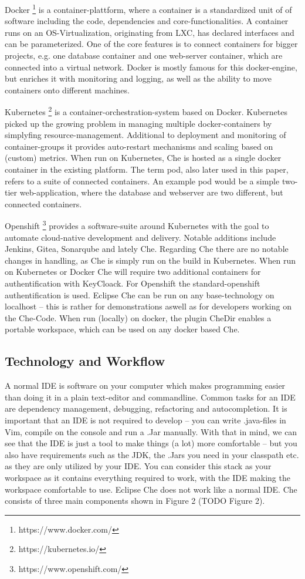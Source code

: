 \documentclass[utf8,biblatex]{lni}
\begin{document}
Docker \footnote{https://www.docker.com/} is a container-plattform, where a container is a standardized unit of of software including the code, dependencies and core-functionalities. 
A container runs on an OS-Virtualization, originating from LXC, has declared interfaces and can be parameterized. 
One of the core features is to connect containers for bigger projects, e.g. one 
database container and one web-server container, which are connected into a virtual network. 
Docker is mostly famous for this docker-engine, but enriches it with monitoring and logging, as well as the ability to move containers onto different machines.   

Kubernetes \footnote{https://kubernetes.io/} is a container-orchestration-system based on Docker. 
Kubernetes picked up the growing problem in managing multiple docker-containers by  simplyfing  resource-management. 
Additional to deployment and monitoring of container-groups it provides auto-restart mechanisms and scaling based on (custom) metrics. 
When run on Kubernetes, Che is hosted as a single docker container in the existing platform.
The term pod, also later used in this paper, refers to a suite of connected containers. 
An example pod would be a simple two-tier web-application, where the database and webserver are two different, but connected containers.

Openshift \footnote{https://www.openshift.com/} provides a software-suite around Kubernetes with the goal to automate cloud-native development and delivery.
Notable  additions  include  Jenkins,  Gitea,  Sonarqube and lately Che. 
Regarding Che there are no notable changes in handling, as Che is simply run on the build in Kubernetes.
When run on Kubernetes or Docker Che will require two additional containers for authentification with KeyCloack. 
For Openshift the standard-openshift authentification is used.  
Eclipse Che  can be run  on any  base-technology  on  localhost – this is rather for demonstrations aswell as for developers working on the Che-Code. 
When run (locally) on docker, the plugin CheDir enables a portable workspace, 
which can be used on any docker based Che.
\subsection{Technology and Workflow}
A normal IDE is software on your computer which makes programming easier than doing it in a plain text-editor and commandline. 
Common tasks for an IDE are dependency management, debugging, refactoring and autocompletion.
It is important that an IDE is not required to develop – you can write .java-files in Vim, compile on the console and run a .Jar manually. 
With that in mind, we can see that the IDE is just a tool to make things (a lot) more comfortable – but you also have requirements such as the JDK, the .Jars you need in your classpath etc. as they are only utilized by your IDE.
You can consider this stack as your workspace as it contains everything required to work, with the IDE making the workspace comfortable to use.
Eclipse Che does not work like a normal IDE. 
Che consists of three main components shown in Figure 2 (TODO Figure 2).
\end{document}
